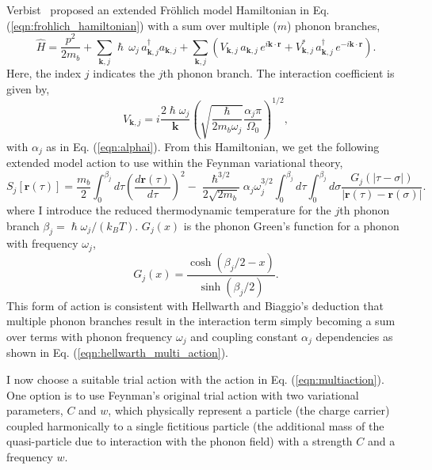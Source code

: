 Verbist~\cite{verbist_extended_1992} proposed an extended Fr\"ohlich model Hamiltonian in Eq. (\ref{eqn:frohlich_hamiltonian}) with a sum over multiple ($m$) phonon branches,
\begin{equation}
    \hat{H} = \frac{p^2}{2m_b} + \sum_{\mathbf{k}, j} \hslash \, \omega_{j} \, a_{\mathbf{k}, j}^\dagger a_{\mathbf{k}, j}
    + \sum_{\mathbf{k}, j} ( V_{\mathbf{k}, j} \, a_{\mathbf{k}, j} \, e^{i\mathbf{k} \cdot \mathbf{r}} + V_{\mathbf{k}, j}^* \, a_{\mathbf{k}, j}^\dagger \, e^{-i\mathbf{k} \cdot \mathbf{r}}) .
\label{eqn:multifrohlich}
\end{equation}
Here, the index $j$ indicates the $j$th phonon branch. The interaction coefficient is given by,
\begin{equation}
    V_{\mathbf{k}, j} = i\frac{2 \hslash \omega_j}{\mathbf{k}} \left(\sqrt{\frac{\hslash}{2 m_b \omega_j}} \frac{\alpha_j \pi}{\Omega_0} \right)^{1/2},
\end{equation}
with $\alpha_j$ as in Eq. (\ref{eqn:alphai}). From this Hamiltonian, we get the following extended model action to use within the Feynman variational theory,
\begin{equation}
        S_j[\mathbf{r}(\tau)] =
        \frac{m_b}{2}\int^{\beta_j}_0 d\tau \left(\frac{d\mathbf{r}(\tau)}{d\tau}\right)^2 -
        \frac{\hslash^{3/2}}{2\sqrt{2 m_b}} \alpha_j \omega_{j}^{3/2} \int^{\beta_j}_0 d\tau \int^{\beta_j}_0 d\sigma \frac{G_j(|\tau - \sigma|)}{|\mathbf{r}(\tau) - \mathbf{r}(\sigma)|} .
\label{eqn:multiaction}
\end{equation}
where I introduce the reduced thermodynamic temperature for the $j$th phonon branch $\beta_j = \hslash \omega_j / (k_B T)$. $G_j(x)$ is the phonon Green's function for a phonon with frequency $\omega_j$, 
\begin{equation}
    G_j(x) = \frac{\cosh{(\beta_j/2-x)}}{\sinh{(\beta_j/2)}} .
\end{equation}
This form of action is consistent with Hellwarth and Biaggio's deduction that multiple phonon branches result in the interaction term simply becoming a sum over terms with phonon frequency $\omega_j$ and coupling constant $\alpha_j$ dependencies as shown in Eq. (\ref{eqn:hellwarth_multi_action}). 

I now choose a suitable trial action with the action in Eq. (\ref{eqn:multiaction}). One option is to use Feynman's original trial action with two variational parameters, $C$ and $w$, which physically represent a particle (the charge carrier) coupled harmonically to a single fictitious particle (the additional mass of the quasi-particle due to interaction with the phonon field) with a strength $C$ and a frequency $w$. 

